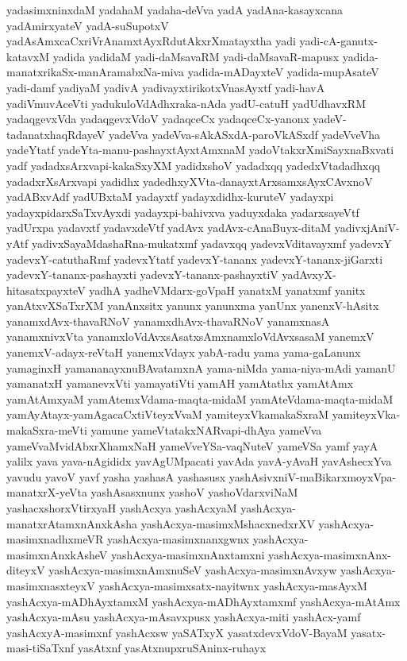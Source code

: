 {yadasimxninxdaM
yadahaM
yadaha-deVva
yadA
yadAna-kasayxcana
yadAmirxyateV
yadA-suSupotxV
yadAsAmxcaCxriVrAnamxtAyxRdutAkxrXmatayxtha
yadi
yadi-cA-ganutx-katavxM
yadida
yadidaM
yadi-daMsavaRM
yadi-daMsavaR-mapusx
yadida-manatxrikaSx-manAramabxNa-miva
yadida-mADayxteV
yadida-mupAsateV
yadi-damf
yadiyaM
yadivA
yadivayxtirikotxVnasAyxtf
yadi-havA
yadiVmuvAceVti
yadukuloVdAdhxraka-nAda
yadU-catuH
yadUdhavxRM
yadaqgevxVda
yadaqgevxVdoV
yadaqceCx
yadaqceCx-yanonx
yadeV-tadanatxhaqRdayeV
yadeVva
yadeVva-sAkASxdA-paroVkASxdf
yadeVveVha
yadeYtatf
yadeYta-manu-pashayxtAyxtAmxnaM
yadoVtakxrXmiSayxnaBxvati
yadf
yadadxsArxvapi-kakaSxyXM
yadidxshoV
yadadxqq
yadedxVtadadhxqq
yadadxrXsArxvapi
yadidhx
yadedhxyXVta-danayxtArxsamxsAyxCAvxnoV
yadABxvAdf
yadUBxtaM
yadayxtf
yadayxdidhx-kuruteV
yadayxpi
yadayxpidarxSaTxvAyxdi
yadayxpi-bahivxva
yaduyxdaka
yadarxsayeVtf
yadUrxpa
yadavxtf
yadavxdeVtf
yadAvx
yadAvx-cAnaBuyx-ditaM
yadivxjAniV-yAtf
yadivxSayaMdashaRna-mukatxmf
yadavxqq
yadevxVditavayxmf
yadevxY
yadevxY-catuthaRmf
yadevxYtatf
yadevxY-tananx
yadevxY-tananx-jiGarxti
yadevxY-tananx-pashayxti
yadevxY-tananx-pashayxtiV
yadAvxyX-hitasatxpayxteV
yadhA
yadheVMdarx-goVpaH
yanatxM
yanatxmf
yanitx
yanAtxvXSaTxrXM
yanAnxsitx
yanunx
yanunxma
yanUnx
yanenxV-hAsitx
yanamxdAvx-thavaRNoV
yanamxdhAvx-thavaRNoV
yanamxnasA
yanamxnivxVta
yanamxloVdAvxsAsatxsAmxnamxloVdAvxsasaM
yanemxV
yanemxV-adayx-reVtaH
yanemxVdayx
yabA-radu
yama
yama-gaLanunx
yamaginxH
yamananayxnuBAvatamxnA
yama-niMda
yama-niya-mAdi
yamanU
yamanatxH
yamanevxVti
yamayatiVti
yamAH
yamAtathx
yamAtAmx
yamAtAmxyaM
yamAtemxVdama-maqta-midaM
yamAteVdama-maqta-midaM
yamAyAtayx-yamAgacaCxtiVteyxVvaM
yamiteyxVkamakaSxraM
yamiteyxVka-makaSxra-meVti
yamune
yameVtatakxNARvapi-dhAya
yameVva
yameVvaMvidAbxrXhamxNaH
yameVveYSa-vaqNuteV
yameVSa
yamf
yayA
yalilx
yava
yava-nAgididx
yavAgUMpacati
yavAda
yavA-yAvaH
yavAshecxYva
yavudu
yavoV
yavf
yasha
yashasA
yashasusx
yashAsivxniV-maBikarxmoyxVpa-manatxrX-yeVta
yashAsasxnunx
yashoV
yashoVdarxviNaM
yashacxshorxVtirxyaH
yashAcxya
yashAcxyaM
yashAcxya-manatxrAtamxnAnxkAsha
yashAcxya-masimxMshacxnedxrXV
yashAcxya-masimxnadhxmeVR
yashAcxya-masimxnanxgwnx
yashAcxya-masimxnAnxkAsheV
yashAcxya-masimxnAnxtamxni
yashAcxya-masimxnAnx-diteyxV
yashAcxya-masimxnAmxnuSeV
yashAcxya-masimxnAvxyw
yashAcxya-masimxnasxteyxV
yashAcxya-masimxsatx-nayitwnx
yashAcxya-masAyxM
yashAcxya-mADhAyxtamxM
yashAcxya-mADhAyxtamxmf
yashAcxya-mAtAmx
yashAcxya-mAsu
yashAcxya-mAsavxpusx
yashAcxya-miti
yashAcx-yamf
yashAcxyA-masimxnf
yashAcxsw
yaSATxyX
yasatxdevxVdoV-BayaM
yasatx-masi-tiSaTxnf
yasAtxnf
yasAtxnupxruSAninx-ruhayx
}
